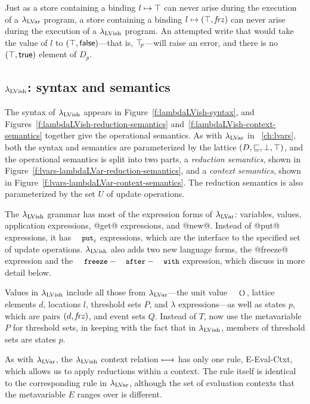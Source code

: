 \noindent Just as a store containing a binding $l \mapsto \top$ can
never arise during the execution of a $\lambda_{\textrm{LVar}}$ program, a store
containing a binding $l \mapsto (\top, \mathit{frz})$ can never arise
during the execution of a $\lambda_{\textrm{LVish}}$ program. An attempted write
that would take the value of $l$ to
$(\top, \textsf{false})$---that is, $\top\hspace{-0.85mm}_{p}$---will raise an error,
and there is no $(\top, \textsf{true})$ element of $D_p$.

\subsection{$\lambda_{\textrm{LVish}}$: syntax and semantics}

The syntax of $\lambda_{\textrm{LVish}}$ appears in
Figure~\ref{f:lambdaLVish-syntax}, and
Figures~\ref{f:lambdaLVish-reduction-semantics}
and~\ref{f:lambdaLVish-context-semantics} together give the
operational semantics.  As with $\lambda_{\textrm{LVar}}$ in
~\ref{ch:lvars}, both the syntax and semantics are
parameterized by the lattice $(D, \sqsubseteq, \bot, \top)$, and the
operational semantics is split into two parts, a \emph{reduction
  semantics}, shown in
Figure~\ref{f:lvars-lambdaLVar-reduction-semantics}, and a
\emph{context semantics}, shown in
Figure~\ref{f:lvars-lambdaLVar-context-semantics}.  The reduction
semantics is also parameterized by the set $U$ of update operations.

\FigLambdaLVishGrammar

The $\lambda_{\textrm{LVish}}$ grammar has most of the expression forms of
$\lambda_{\textrm{LVar}}$: variables, values, application expressions, @get@
expressions, and @new@.  Instead of @put@ expressions, it has $\PUTi$
expressions, which are the interface to the specified set of update
operations.  $\lambda_{\textrm{LVish}}$ also adds two new language forms, the
@freeze@ expression and the $\FAW$ expression, which  discuss in more
detail below.

Values in $\lambda_{\textrm{LVish}}$ include all those from $\lambda_{\textrm{LVar}}$---the
unit value $\unit$, lattice elements $d$, locations $l$, threshold
sets $P$, and $\lambda$ expressions---as well as states $p$, which are
pairs $(d, \mathit{frz})$, and event sets $Q$.  Instead of $T$,  now
use the metavariable $P$ for threshold sets, in keeping with the fact
that in $\lambda_{\textrm{LVish}}$, members of threshold sets are states $p$.

As with $\lambda_{\textrm{LVar}}$, the $\lambda_{\textrm{LVish}}$ context relation
$\longmapsto$ has only one rule, {\sc E-Eval-Ctxt}, which allows us to
apply reductions within a context. The rule itself is identical to the
corresponding rule in $\lambda_{\textrm{LVar}}$, although the set of evaluation
contexts that the metavariable $E$ ranges over is different.

